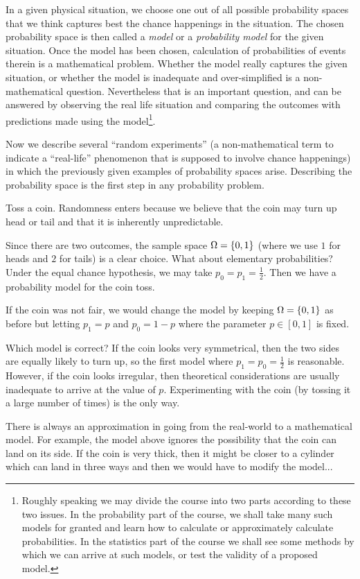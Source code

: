 \documentclass[preprint,  11pt]{amsart}
\def\half{\frac{1}{2}}
\begin{document}
 In a given physical situation, we choose one out of all possible probability spaces that we think captures best the chance happenings in the situation. The chosen probability space is then called a {\em model} or a {\em probability model} for the given situation. Once the model has been chosen, calculation of probabilities of events therein is a mathematical problem. Whether the model really captures the given situation, or whether the model is inadequate and over-simplified is a non-mathematical question. Nevertheless that is an important question, and can be answered by observing the real life situation and comparing the outcomes with predictions made using the model\footnote{Roughly speaking we may divide the course into two parts according to these two issues. In the probability part of the course, we shall take many such models for granted and learn how to calculate or approximately calculate probabilities. In the statistics part of the course we shall see some methods by which we can arrive at such models, or test the validity of a proposed model.}.

 Now we describe several ``random experiments'' (a non-mathematical term to indicate a ``real-life'' phenomenon that is supposed to involve chance happenings) in which the previously given examples of probability spaces arise. Describing the probability space is the first step in any probability problem.

\begin{example}  Toss a coin. Randomness enters because we believe that the coin may turn up head or tail and that it is inherently unpredictable.

 Since there are two outcomes, the sample space $\Omega=\{0,1\}$ (where we use $1$ for heads and $2$ for tails) is a clear choice. What about elementary probabilities? Under the equal chance hypothesis, we may take $p_{0}=p_{1}=\frac{1}{2}$. Then we have a probability model for the coin toss.

 If the coin was not fair, we would change the model by keeping $\Omega=\{0,1\}$ as before but letting $p_{1}=p$ and $p_{0}=1-p$ where the parameter  $p\in [0,1]$ is fixed.

Which model is correct? If the coin looks very symmetrical, then the two sides are equally likely to turn up, so the first model where $p_{1}=p_{0}=\half$ is reasonable. However, if the coin looks irregular, then theoretical considerations are usually inadequate to arrive at the value of $p$. Experimenting with the coin (by tossing it a large number of times) is the only way.

There is always an approximation in going from the real-world to a mathematical model. For example, the model above ignores the possibility that the coin can land on its side. If the coin is very thick, then it might be closer to a cylinder which can land in three ways and then we would have to modify the model...
\end{example}
\end{document}
